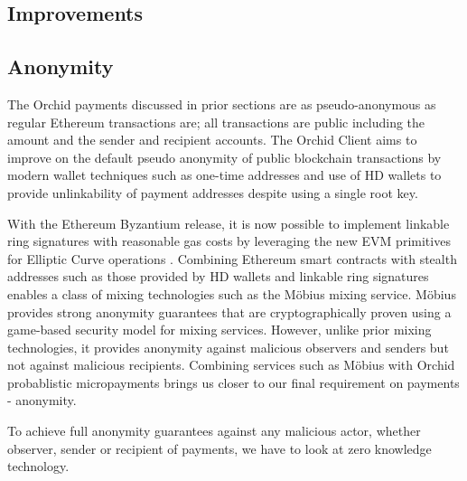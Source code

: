 

\subsection{Improvements}

\subsection{Anonymity}
\label{sec:anon}

The Orchid payments discussed in prior sections are as pseudo-anonymous as regular Ethereum transactions are; all transactions are public including the amount and the sender and recipient accounts. The Orchid Client aims to improve on the default pseudo anonymity of public blockchain transactions by modern wallet techniques such as one-time addresses \cite{AddressReuse} and use of HD wallets \cite{HDWallets} to provide unlinkability of payment addresses despite using a single root key.

With the Ethereum Byzantium release, it is now possible to implement linkable ring signatures with reasonable gas costs by leveraging the new EVM primitives for Elliptic Curve operations \cite{ETHRingSigs}. Combining Ethereum smart contracts with stealth addresses such as those provided by HD wallets and linkable ring signatures enables a class of mixing technologies such as the Möbius\cite{Moebius} mixing service. Möbius provides strong anonymity guarantees that are cryptographically proven using a game-based security model for mixing services. However, unlike prior mixing technologies, it provides anonymity against malicious observers and senders but not against malicious recipients. Combining services such as Möbius with Orchid probablistic micropayments brings us closer to our final requirement on payments - anonymity.

To achieve full anonymity guarantees against any malicious actor, whether observer, sender or recipient of payments, we have to look at zero knowledge technology.


